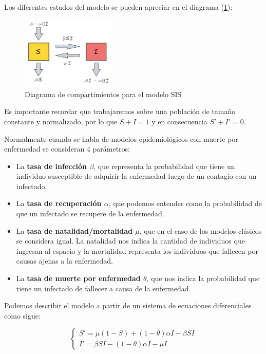 Los diferentes estados del modelo se pueden apreciar en el diagrama (\ref{fig:diagrama SIS}):

\begin{figure}[h]
  \centering
    \includegraphics[width=0.4\textwidth]{Imagenes/SIS_compartimientos.PNG}
  \caption{Diagrama de compartimientos para el modelo SIS}
  \label{fig:diagrama SIS}
\end{figure}

Es importante recordar que trabajaremos sobre una población de tamaño constante y normalizado, por lo que $S + I = 1$ y en consecuencia $S' + I' = 0$.

Normalmente cuando se habla de modelos epidemiológicos con muerte por enfermedad se consideran 4 parámetros: 

\begin{itemize}
    \item La \textbf{tasa de infección $\beta$}, que representa la probabilidad que tiene un individuo susceptible de adquirir la enfermedad luego de un contagio con un infectado.
    \item La \textbf{tasa de recuperación $\alpha$}, que podemos entender como la probabilidad de que un infectado se recupere de la enfermedad.
    \item La \textbf{tasa de natalidad/mortalidad $\mu$}, que en el caso de los modelos clásicos se considera igual. La natalidad nos indica la cantidad de individuos que ingresan al espacio y la mortalidad representa los individuos que fallecen por causas ajenas a la enfermedad.
    \item La \textbf{tasa de muerte por enfermedad $\theta$}, que nos indica la probabilidad que tiene un infectado de fallecer a causa de la enfermedad.
\end{itemize}

Podemos describir el modelo a partir de un sistema de ecuaciones diferenciales como sigue:

\begin{equation}\label{eq:Modelo SIS}
\left\{
\begin{array}{l}
S' = \mu(1 - S) + (1 - \theta)\alpha I - \beta S I \\
I' = \beta S I - (1 - \theta)\alpha I - \mu I
\end{array}
\right.
\end{equation}

